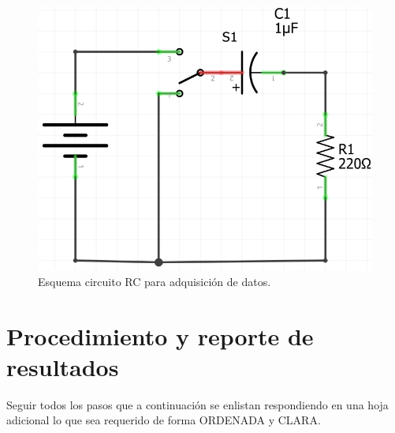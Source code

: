 \documentclass[letterpaper, 12 pt, conference]{ieeeconf}  %
\begin{document}
\begin{figure}[h!]
    \centering
    \includegraphics[scale=0.5]{C1.png}
    \caption{Esquema circuito RC para adquisición de datos.}
\end{figure}


\section{Procedimiento y reporte de resultados}
Seguir todos los pasos que a continuación se enlistan respondiendo en una hoja adicional lo que sea requerido de forma ORDENADA y CLARA.
\end{document}
